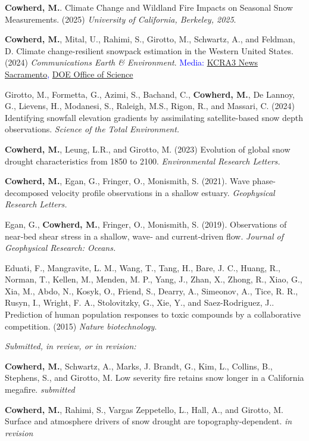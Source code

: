 \item \textbf{Cowherd, M.}. Climate Change and Wildland Fire Impacts on Seasonal Snow Measurements. (2025) \textit{University of California, Berkeley, 2025}.
\item \textbf{Cowherd, M.}, Mital, U., Rahimi, S., Girotto, M., Schwartz, A., and Feldman, D. Climate change-resilient snowpack estimation in the Western United States. (2024) \textit{Communications Earth \& Environment}. \textcolor{blue} {Media: \href{https://www.kcra.com/article/climate-change-estimate-sierra-snowpack-ai/61603975}{KCRA3 News Sacramento}, \href{https://www.energy.gov/science/articles/when-summer-drought-begins-winter-investigating-snow-drought}{DOE Office of Science}}
\item Girotto, M., Formetta, G., Azimi, S., Bachand, C., \textbf{Cowherd, M.}, De Lannoy, G., Lievens, H., Modanesi, S., Raleigh, M.S., Rigon, R., and Massari, C. (2024) Identifying snowfall elevation gradients by assimilating satellite-based snow depth observations. \textit{Science of the Total Environment.}
\item \textbf{Cowherd, M.}, Leung, L.R., and Girotto, M. (2023) Evolution of global snow drought characteristics from 1850 to 2100. \textit{Environmental Research Letters.}
\item \textbf{Cowherd, M.}, Egan, G., Fringer, O., Monismith, S. (2021). Wave phase-decomposed velocity profile observations in a shallow estuary. \textit{Geophysical Research Letters.}
\item Egan, G., \textbf{Cowherd, M.}, Fringer, O., Monismith, S. (2019). Observations of near‐bed shear stress in a shallow, wave‐ and current‐driven flow. \textit{Journal of Geophysical Research: Oceans.}
\item Eduati, F., Mangravite, L. M., Wang, T., Tang, H., Bare, J. C., Huang, R., Norman, T., Kellen, M., Menden, M. P., Yang, J., Zhan, X., Zhong, R., Xiao, G., Xia, M., Abdo, N., Kosyk, O., Friend, S., Dearry, A., Simeonov, A., Tice, R. R., Rusyn, I., Wright, F. A., Stolovitzky, G., Xie, Y., and Saez-Rodriguez, J.. Prediction of human population responses to toxic compounds by a collaborative competition. (2015) \textit{Nature biotechnology}.
\item \textit{Submitted, in review, or in revision:}
\item \textbf{Cowherd, M.}, Schwartz, A., Marks, J. Brandt, G., Kim, L., Collins, B., Stephens, S., and Girotto, M. Low severity fire retains snow longer in a California megafire. \textit{submitted}
\item \textbf{Cowherd, M.}, Rahimi, S., Vargas Zeppetello, L., Hall, A., and Girotto, M. Surface and atmosphere drivers of snow drought are topography-dependent. \textit{in revision}
